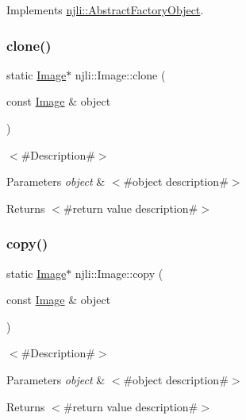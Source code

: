 Implements \mbox{\hyperlink{classnjli_1_1_abstract_factory_object_a4763d05bc9dc37c559111f8bb30e1dd8}{njli\+::\+Abstract\+Factory\+Object}}.

\mbox{\label{classnjli_1_1_image_a26954d0fb6f0c64d153b017ce1e9fb5e}} 
\subsubsection{\texorpdfstring{clone()}{clone()}}
{\footnotesize\ttfamily static \mbox{\hyperlink{classnjli_1_1_image}{Image}}$\ast$ njli\+::\+Image\+::clone (\begin{DoxyParamCaption}\item[{const \mbox{\hyperlink{classnjli_1_1_image}{Image}} \&}]{object }\end{DoxyParamCaption})\hspace{0.3cm}{\ttfamily [static]}}

$<$\#\+Description\#$>$


\begin{DoxyParams}{Parameters}
{\em object} & $<$\#object description\#$>$\\
\hline
\end{DoxyParams}
\begin{DoxyReturn}{Returns}
$<$\#return value description\#$>$ 
\end{DoxyReturn}
\mbox{\label{classnjli_1_1_image_ad9424683b5e161bf3688bae039a7dbca}} 
\subsubsection{\texorpdfstring{copy()}{copy()}}
{\footnotesize\ttfamily static \mbox{\hyperlink{classnjli_1_1_image}{Image}}$\ast$ njli\+::\+Image\+::copy (\begin{DoxyParamCaption}\item[{const \mbox{\hyperlink{classnjli_1_1_image}{Image}} \&}]{object }\end{DoxyParamCaption})\hspace{0.3cm}{\ttfamily [static]}}

$<$\#\+Description\#$>$


\begin{DoxyParams}{Parameters}
{\em object} & $<$\#object description\#$>$\\
\hline
\end{DoxyParams}
\begin{DoxyReturn}{Returns}
$<$\#return value description\#$>$ 
\end{DoxyReturn}
\mbox{\label{classnjli_1_1_image_a08bff06bf26c8fd8b7595e02051dd1e8}} 
